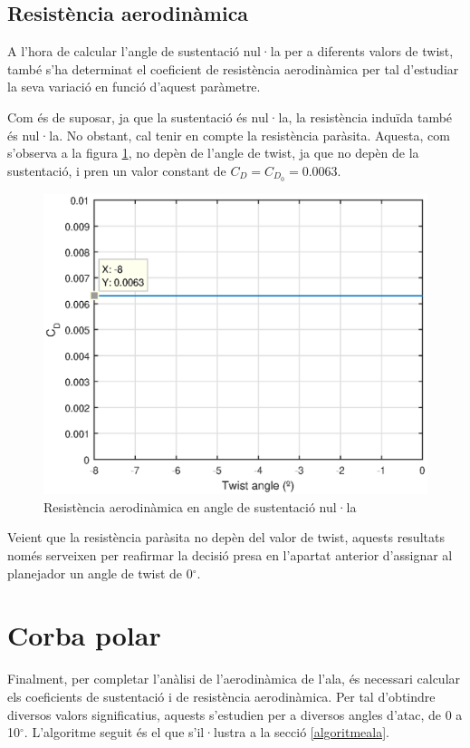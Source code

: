 \subsection{Resistència aerodinàmica}
A l'hora de calcular l'angle de sustentació nul·la per a diferents valors de twist, també s'ha determinat el coeficient de resistència aerodinàmica per tal d'estudiar la seva variació en funció d'aquest paràmetre.

Com és de suposar, ja que la sustentació és nul·la, la resistència induïda també és nul·la. No obstant, cal tenir en compte la resistència paràsita. Aquesta, com s'observa a la figura \ref{cdpar}, no depèn de l'angle de twist, ja que no depèn de la sustentació, i pren un valor constant de $C_{D}=C_{D_{0}}=0.0063$.

\begin{figure}[h]
	\centering
	\includegraphics{./plots/cdparasita}
	\caption{Resistència aerodinàmica en angle de sustentació nul·la}
	\label{cdpar}
\end{figure}

Veient que la resistència paràsita no depèn del valor de twist, aquests resultats només serveixen per reafirmar la decisió presa en l'apartat anterior d'assignar al planejador un angle de twist de 0$^{\circ}$.

\section{Corba polar}
Finalment, per completar l'anàlisi de l'aerodinàmica de l'ala, és necessari calcular els coeficients de sustentació i de resistència aerodinàmica. Per tal d'obtindre diversos valors significatius, aquests s'estudien per a diversos angles d'atac, de 0 a 10$^{\circ}$. L'algoritme seguit és el que s'il·lustra a la secció \ref{algoritmeala}.

